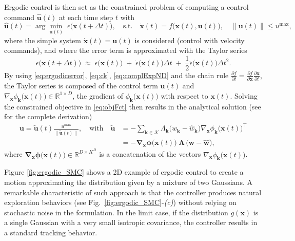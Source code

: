 \documentclass[10pt,a4paper]{article} %
\newcommand{\trsp}{{\scriptscriptstyle\top}}
\begin{document}
Ergodic control is then set as the constrained problem of computing a control command $\bm{\hat{u}}(t)$ at each time step $t$ with 
\begin{equation}
	\bm{\hat{u}}(t) = \arg\min_{\bm{u}(t)}\; \epsilon\big(\bm{x}(t\!+\!\Delta t)\big), 
	\quad \text{s.t.} \quad
	\bm{\dot{x}}(t) = f\big(\bm{x}(t),\bm{u}(t)\big),\quad \|\bm{u}(t)\| \leqslant u^{\max},
	\label{eq:objFct}
\end{equation}
where the simple system $\bm{\dot{x}}(t)=\bm{u}(t)$ is considered (control with velocity commands), and where the error term is approximated with the Taylor series
\begin{equation}
	\epsilon\big(\bm{x}(t\!+\!\Delta t)\big) \;\approx\; \epsilon\big(\bm{x}(t)\big) \;+\; \dot{\epsilon}\big(\bm{x}(t)\big) \Delta t 
	\;+\; \frac{1}{2} \ddot{\epsilon}\big(\bm{x}(t)\big) {\Delta t}^2.
	\label{eq:etpp}
\end{equation}
By using \eqref{eq:ergodicerror}, \eqref{eq:ck}, \eqref{eq:complExpND} and the chain rule $\frac{\partial f}{\partial t}=\frac{\partial f}{\partial \bm{x}} \frac{\partial \bm{x}}{\partial t}$, the Taylor series
is composed of the control term $\bm{u}(t)$ and $\nabla_{\!\!\bm{x}} \phi_{\bm{k}}\big(\bm{x}(t)\big)\in\mathbb{R}^{1\times D}$, the gradient of $\phi_{\bm{k}}\big(\bm{x}(t)\big)$ with respect to $\bm{x}(t)$.
Solving the constrained objective in \eqref{eq:objFct} then results in the analytical solution (see \cite{Mathew09} for the complete derivation)
\begin{align}
	\bm{u} = \bm{\tilde{u}}(t)\frac{u^{\max}}{\|\bm{\tilde{u}}(t)\|},
	\quad\mathrm{with}\quad
	\bm{\tilde{u}} &= -\sum_{{\bm{k}}\in\mathcal{K}} \Lambda_{\bm{k}} \big( w_{\bm{k}} - \hat{w}_{\bm{k}} \big) 
	{\nabla_{\!\!\bm{x}} \phi_{\bm{k}}\big(\bm{x}(t)\big)}^\trsp\nonumber\\
	&= -\bm{\nabla}_{\!\!\bm{x}}\bm{\phi}\big(\bm{x}(t)\big) \; \bm{\Lambda} \, \big( \bm{w} - \bm{\hat{w}} \big),
\end{align}
where $\bm{\nabla}_{\!\!\bm{x}}\bm{\phi}\big(\bm{x}(t)\big)\in\mathbb{R}^{D\times K^D}$ is a concatenation of the vectors $\nabla_{\!\!\bm{x}} \phi_{\bm{k}}\big(\bm{x}(t)\big)$.   

Figure \ref{fig:ergodic_SMC} shows a 2D example of ergodic control to create a motion approximating the distribution given by a mixture of two Gaussians. A remarkable characteristic of such approach is that the controller produces natural exploration behaviors (see Fig.~\ref{fig:ergodic_SMC}-\emph{(c)}) without relying on stochastic noise in the formulation. In the limit case, if the distribution $g(\bm{x})$ is a single Gaussian with a very small isotropic covariance, the controller results in a standard tracking behavior.
\end{document}
